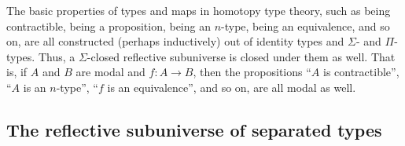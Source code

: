 \begin{rmk}
  The basic properties of types and maps in homotopy type theory, such as being contractible, being a proposition, being an $n$-type, being an equivalence, and so on, are all constructed (perhaps inductively) out of identity types and $\Sigma$- and $\Pi$-types.
  Thus, a $\Sigma$-closed reflective subuniverse is closed under them as well.
  That is, if $A$ and $B$ are modal and $f:A\to B$, then the propositions ``$A$ is contractible'', ``$A$ is an $n$-type'', ``$f$ is an equivalence'', and so on, are all modal as well.
\end{rmk}

\subsection{The reflective subuniverse of separated types}
